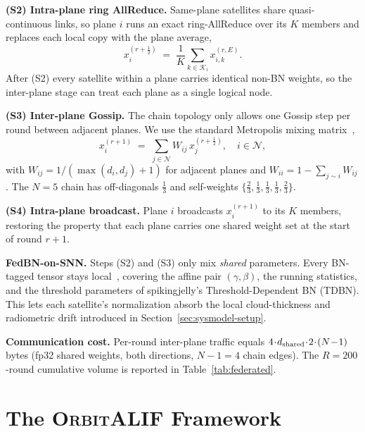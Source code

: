 \documentclass[conference]{IEEEtran}
\newcommand{\OrbitALIF}{\textsc{OrbitALIF}}
\begin{document}
\textbf{(S2) Intra-plane ring AllReduce.} Same-plane satellites
share quasi-continuous links, so plane $i$ runs an exact
ring-AllReduce over its $K$ members and replaces each local copy
with the plane average,
\begin{equation}
x_i^{(r+\frac{1}{2})}
\;=\;
\frac{1}{K}\sum_{k \in \mathcal{K}_i} x_{i,k}^{(r,E)}.
\label{eq:intraplane}
\end{equation}
After (S2) every satellite within a plane carries identical non-BN
weights, so the inter-plane stage can treat each plane as a single
logical node.

\textbf{(S3) Inter-plane Gossip.} The chain topology only allows
one Gossip step per round between adjacent planes. We use the
standard Metropolis mixing matrix~\cite{ref:gossip-boyd},
\begin{equation}
x_i^{(r+1)}
\;=\;
\sum_{j \in \mathcal{N}} W_{ij}\, x_j^{(r+\frac{1}{2})},
\quad i \in \mathcal{N},
\label{eq:gossip}
\end{equation}
with $W_{ij}\!=\!1/(\max(d_i,d_j)\!+\!1)$ for adjacent planes and
$W_{ii}\!=\!1\!-\!\sum_{j\sim i} W_{ij}$. The $N\!=\!5$ chain has
off-diagonals $\tfrac{1}{3}$ and self-weights
$\{\tfrac{2}{3},\tfrac{1}{3},\tfrac{1}{3},\tfrac{1}{3},\tfrac{2}{3}\}$.

\textbf{(S4) Intra-plane broadcast.} Plane $i$ broadcasts
$x_i^{(r+1)}$ to its $K$ members, restoring the property that each
plane carries one shared weight set at the start of round $r+1$.

\textbf{FedBN-on-SNN.} Steps (S2) and (S3) only mix \emph{shared}
parameters. Every BN-tagged tensor stays local~\cite{ref:fedbn},
covering the affine pair $(\gamma,\beta)$, the running statistics,
and the threshold parameters of spikingjelly's Threshold-Dependent
BN (TDBN). This lets each satellite's normalization absorb the
local cloud-thickness and radiometric drift introduced in
Section~\ref{sec:sysmodel-setup}.

\textbf{Communication cost.} Per-round inter-plane traffic equals
$4\!\cdot\!d_{\rm shared}\!\cdot\!2\!\cdot\!(N\!-\!1)$ bytes (fp32
shared weights, both directions, $N\!-\!1\!=\!4$ chain edges). The
$R\!=\!200$-round cumulative volume is reported in
Table~\ref{tab:federated}.

\section{The \OrbitALIF{} Framework}\label{sec:framework}
\end{document}
